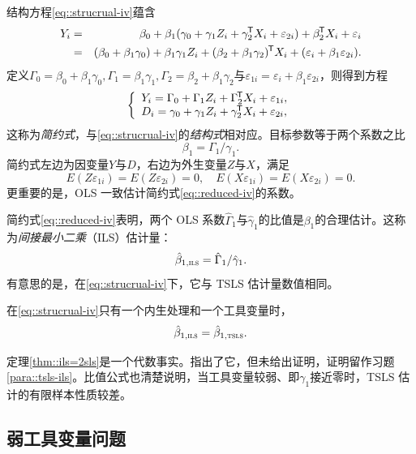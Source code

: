 结构方程\eqref{eq::strucrual-iv}蕴含
\begin{eqnarray*}
Y_i &=&\beta_0 + \beta_1 (\gamma_0 + \gamma_1 Z_i + \gamma_2 ^{\mkern-1.5mu\mathsf{T}} X_i + \varepsilon_{2i}) + \beta_2^{\mkern-1.5mu\mathsf{T}} X_i + \varepsilon_{i} \\
&=& (\beta_0 + \beta_1\gamma_0 ) + \beta_1  \gamma_1 Z_i  + ( \beta_2 + \beta_1 \gamma_2 )^{\mkern-1.5mu\mathsf{T}} X_i  + ( \varepsilon_{i} + \beta_1 \varepsilon_{2i} ).
\end{eqnarray*}
定义$\Gamma_0 = \beta_0 + \beta_1\gamma_0, \Gamma_1  =  \beta_1  \gamma_1, \Gamma_2 = \beta_2 + \beta_1 \gamma_2$与$\varepsilon_{1i} = \varepsilon_{i} + \beta_1 \varepsilon_{2i}$，则得到方程
\begin{eqnarray}
\label{eq::reduced-iv}
\left\{
\begin{array}{l}
Y_i =\Gamma_0 + \Gamma_1 Z_i + \Gamma_2^{\mkern-1.5mu\mathsf{T}} X_i + \varepsilon_{1i},\\
D_i = \gamma_0 + \gamma_1 Z_i + \gamma_2 ^{\mkern-1.5mu\mathsf{T}} X_i + \varepsilon_{2i},
\end{array}
\right.
\end{eqnarray}
这称为{\it 简约式}，与\eqref{eq::strucrual-iv}的{\it 结构式}相对应。目标参数等于两个系数之比
$$
\beta_1 = \Gamma_1 / \gamma_1.
$$
简约式左边为因变量$Y$与$D$，右边为外生变量$Z$与$X$，满足
$$
E( Z \varepsilon_{1i} ) = E( Z \varepsilon_{2i} )  = 0, \quad 
E( X \varepsilon_{1i} ) = E( X \varepsilon_{2i} )  = 0.
$$
更重要的是，OLS 一致估计简约式\eqref{eq::reduced-iv}的系数。 


简约式\eqref{eq::reduced-iv}表明，两个 OLS 系数$\hat{\Gamma}_1$与$\hat{\gamma}_1$的比值是$\beta_1$的合理估计。这称为{\it 间接最小二乘}（ILS）估计量：
$$
\hat{\beta}_{1,\textsc{ils}} =  \hat{\Gamma}_1 / \hat{\gamma}_1 .
$$
有意思的是，在\eqref{eq::strucrual-iv}下，它与 TSLS 估计量数值相同。

\begin{theorem}
\label{thm::ils=2sls}
在\eqref{eq::strucrual-iv}只有一个内生处理和一个工具变量时，
$$
\hat{\beta}_{1,\textsc{ils}}   = \hat{\beta}_{1,\textsc{tsls}} . 
$$
\end{theorem}

定理\ref{thm::ils=2sls}是一个代数事实。\citet[][Section A.3]{imbens2014instrumental}指出了它，但未给出证明，证明留作习题\ref{para::tsls-ils}。比值公式也清楚说明，当工具变量较弱、即$\gamma_1 $接近零时，TSLS 估计的有限样本性质较差。 



\subsection{弱工具变量问题}

